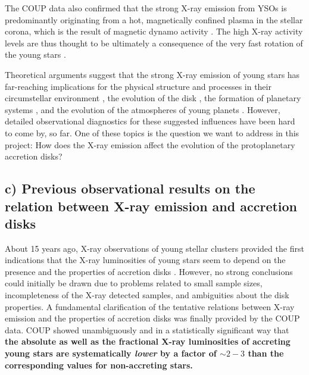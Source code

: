 \documentclass[10pt,fleqn,twoside]{article}
\newcommand{\Tcol}{\color{blue}}
\begin{document}
The COUP data also confirmed 
that the strong X-ray emission from YSOs  is predominantly originating from
 a hot, magnetically confined plasma in the stellar corona, which is the result of magnetic
dynamo activity \citep{Preibisch_coup_orig}. 
The high X-ray activity levels are thus thought to be ultimately a consequence of
the very fast rotation of the young stars \citep[e.g.,][]{AP12}.

Theoretical arguments suggest that 
the strong X-ray emission of young stars  has far-reaching implications
for the physical structure and processes in their circumstellar environment 
\citep[e.g.,][]{Glassgold05,Wolk05,EG13}, 
the evolution of the disk \citep[e.g.,][]{Ercolano14}, the
formation of planetary systems \citep[e.g.][]{ER15}, and the evolution of 
the atmospheres of young planets \citep[e.g.,][]{Johnstone15}.
However, detailed observational diagnostics for these suggested influences
 have been hard to come by, so far.
One of these topics is the
question we want to address in this project: How does the X-ray emission
affect the evolution of the protoplanetary accretion disks?




\subsection*{\Tcol c) Previous observational results on the relation between 
X-ray emission and accretion disks}

About 15 years ago, 
X-ray observations of young stellar clusters provided the first indications that
the X-ray luminosities of young stars seem to depend on the presence
and the properties of accretion disks \citep[e.g.][]{Stelzer01}.
However, no strong conclusions
could initially be drawn due to problems related to small sample sizes, incompleteness of the
 X-ray detected samples, and ambiguities about the disk properties.
%
A fundamental clarification of the tentative relations between X-ray emission and
the properties of accretion disks was finally provided by the COUP data.
COUP showed unambiguously
and in a statistically significant way
that \textbf{the  absolute as well as the fractional X-ray luminosities
of accreting young stars are systematically {\em lower} by a factor of
 $\sim 2-3$ than the corresponding values for  non-accreting stars.}
%
\end{document}
